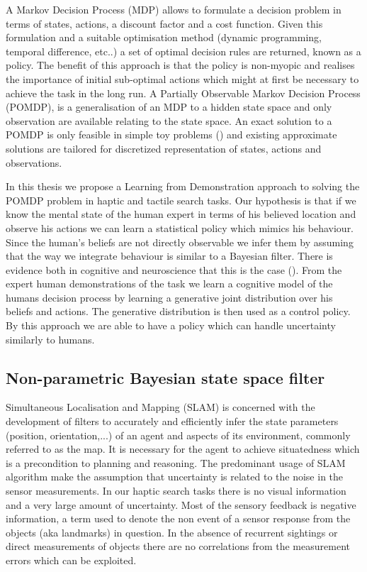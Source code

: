 A Markov Decision Process (MDP) allows to formulate a decision problem in terms of states, actions, a discount factor 
and a cost function. Given this formulation and a suitable optimisation method (dynamic programming, temporal difference, etc..) 
a set of optimal decision rules are returned, known as a policy. The benefit of this approach 
is that the policy is non-myopic and realises the importance of initial sub-optimal actions which might at first 
be necessary to achieve the task in the long run. A Partially Observable Markov Decision Process (POMDP), is 
a generalisation of an MDP to a hidden state space and only observation are available relating 
to the state space. An exact solution to a POMDP is only feasible in simple toy problems 
(\cite{Thrun_Burgard_Fox_2005}) and existing approximate solutions are tailored for discretized 
representation of states, actions and observations.

In this thesis we propose a Learning from Demonstration approach to solving the POMDP problem in
haptic and tactile search tasks. Our hypothesis is that if we know the mental state of the human 
expert in terms of his believed location and observe his actions we can learn a statistical policy 
which mimics his behaviour. Since the human's beliefs are not directly observable we infer them 
by assuming that the way we integrate behaviour is similar to a Bayesian filter. There is   
evidence both in cognitive and neuroscience that this is the case (\cite{Bake_Saxe_Tene_2011}). From 
the expert human demonstrations of the task we learn a cognitive model of the humans decision process 
by learning a generative joint distribution over his beliefs and actions. The generative distribution 
is then used as a control policy. By this approach we are able to have a policy which can handle uncertainty
similarly to humans. 

\subsection{Non-parametric Bayesian state space filter}

Simultaneous Localisation and Mapping (SLAM) is concerned with the development of filters to accurately and efficiently infer 
the state parameters (position, orientation,...) of an agent and aspects of its environment, commonly referred to as the map. 
It is necessary for the agent to achieve situatedness which is a precondition to planning and reasoning. The 
predominant usage of SLAM algorithm make the assumption that uncertainty is related to the noise in the sensor measurements. In 
our haptic search tasks there is no visual information and a very large amount of uncertainty. Most of the sensory
feedback is negative information, a term used to denote the non event of a sensor response from the objects (aka landmarks) in question.
In the absence of recurrent sightings or direct measurements of objects there are no correlations from the measurement errors 
which can be exploited. 

